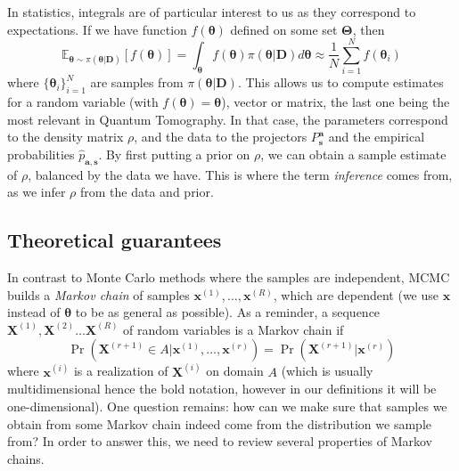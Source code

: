 \documentclass[12pt]{memoir}
\newcommand{\mb}{\mathbf}
\newcommand{\ti}{\textit}
\newcommand{\btheta}{\boldsymbol{\theta}}
\begin{document}
In statistics, integrals are of particular interest to us as they correspond to expectations. If we have function $f(\boldsymbol{\theta})$ defined on some set $\boldsymbol{\Theta}$, then
\begin{equation}
    \mathbb E_{\boldsymbol \theta \sim \pi(\btheta|\mb{D})}\left[f(\boldsymbol{\theta})\right] = \int_{\boldsymbol{\theta}} f(\boldsymbol{\theta})\pi(\btheta|\mb{D}) d\boldsymbol{\btheta} \approx \frac{1}{N} \sum_{i=1}^{N} f(\boldsymbol{\theta}_i)
\end{equation}
where $\{\boldsymbol{\theta}_i\}^N_{i=1}$ are samples from $\pi(\btheta|\mb{D})$. This allows us to compute estimates for a random variable (with $f(\btheta) = \btheta$), vector or matrix, the last one being the most relevant in Quantum Tomography. In that case, the parameters correspond to the density matrix $\rho$, and the data to the projectors $P^{\mb a}_{\mb s}$ and the empirical probabilities $\hat p_{\mb a,\mb s}$. By first putting a prior on $\rho$, we can obtain a sample estimate of $\rho$, balanced by the data we have. This is where the term \ti{inference} comes from, as we infer $\rho$ from the data and prior.

\subsection{Theoretical guarantees}\label{section:background:mcmc:theory}
In contrast to Monte Carlo methods where the samples are independent, MCMC builds a \ti{Markov chain} of samples $\mb x^{(1)}, \dots, \mb x^{(R)}$, which are dependent (we use $\mb x$ instead of $\btheta$ to be as general as possible). As a reminder, a sequence $\mb X^{(1)}, \mb X^{(2)} \dots \mb X^{(R)}$ of random variables is a Markov chain if
\begin{equation}
    \Pr(\mb X^{(r+1)} \in A|\mb x^{(1)}, \dots, \mb x^{(r)}) = \Pr(\mb X^{(r+1)}|\mb x^{(r)})
\end{equation}
where $\mb x^{(i)}$ is a realization of $\mb X^{(i)}$ on domain $A$ (which is usually multidimensional hence the bold notation, however in our definitions it will be one-dimensional). One question remains: how can we make sure that samples we obtain from some Markov chain indeed come from the distribution we sample from? In order to answer this, we need to review several properties of Markov chains.\medbreak
\end{document}
